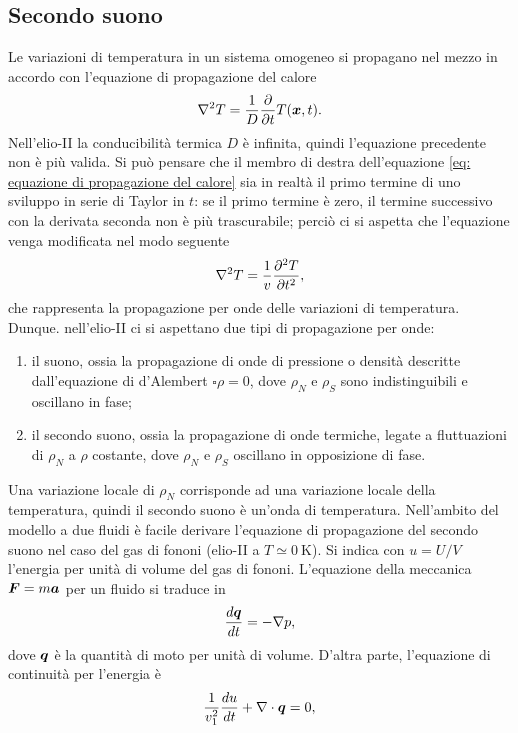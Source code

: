 \subsection{Secondo suono}
Le variazioni di temperatura in un sistema omogeneo si propagano nel mezzo in accordo con l'equazione di propagazione del calore
\begin{equation}
\label{eq: equazione di propagazione del calore}
    \nabla^2 T = \frac{1}{D}\frac{\partial }{\partial t}T(\bm{x},t).
\end{equation}
Nell'elio-II la conducibilità termica $D$ è infinita, quindi l'equazione precedente non è più valida. Si può pensare che il membro di destra dell'equazione \eqref{eq: equazione di propagazione del calore} sia in realtà il primo termine di uno sviluppo in serie di Taylor in $t$: se il primo termine è zero, il termine successivo con la derivata seconda non è più trascurabile; perciò ci si aspetta che l'equazione venga modificata nel modo seguente
\begin{equation}
    \nabla^2 T = \frac{1}{v}\frac{\partial^2 T}{\partial t^2},
\end{equation}
che rappresenta la propagazione per onde delle variazioni di temperatura. Dunque. nell'elio-II ci si aspettano due tipi di propagazione per onde:
\begin{enumerate}
    \item il suono, ossia la propagazione di onde di pressione o densità descritte dall'equazione di d'Alembert $\square\rho = 0$, dove $\rho_N$ e $\rho_S$ sono indistinguibili e oscillano in fase;
    \item il secondo suono, ossia la propagazione di onde termiche, legate a fluttuazioni di $\rho_N$ a $\rho$ costante, dove $\rho_N$ e $\rho_S$ oscillano in opposizione di fase.
\end{enumerate}
Una variazione locale di $\rho_N$ corrisponde ad una variazione locale della temperatura, quindi il secondo suono è un'onda di temperatura. Nell'ambito del modello a due fluidi è facile derivare l'equazione di propagazione del secondo suono nel caso del gas di fononi (elio-II a $T \simeq \SI{0}{\kelvin}$). Si indica con $u = U/V$ l'energia per unità di volume del gas di fononi. L'equazione della meccanica $\bm{F} = m\bm{a}$ per un fluido si traduce in 
\begin{equation}
    \frac{d\bm{q}}{dt} = -\nabla p,
\end{equation}
dove $\bm{q}$ è la quantità di moto per unità di volume. D'altra parte, l'equazione di continuità per l'energia è
\begin{equation}
    \frac{1}{v_1^2}\frac{d u}{dt} + \nabla \cdot \bm{q} = 0,
\end{equation}
